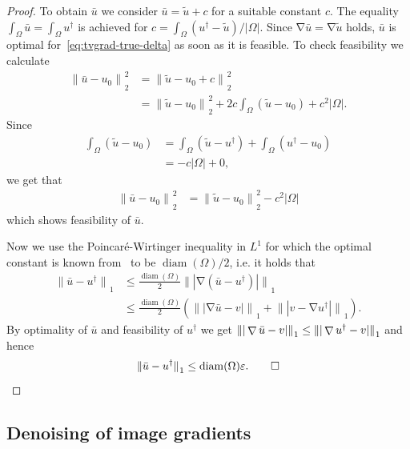 \documentclass[twocolumn,envcountsame]{svjour3}
\newcommand{\norm}[2][]{{\|{#2}\|_{}}_{#1}}
\newcommand{\abs}[1]{|#1|}
\newcommand{\udag}{u^{\dagger}}
\DeclareMathOperator{\diam}{diam}
\DeclareMathOperator{\grad}{\nabla}
\begin{document}
\begin{proof}
  To obtain $\bar u$ we consider $\bar u = \tilde u + c$ for a
  suitable constant $c$. The equality
  $\int_{\Omega}\bar u = \int_{\Omega}\udag$ is achieved for
  $c = \int_{\Omega}(\udag - \tilde u)/\abs{\Omega}$. Since
  $\grad\bar u = \grad \tilde u$ holds, $\bar u$ is optimal
  for~\eqref{eq:tvgrad-true-delta} as soon as it is feasible. To check
  feasibility we calculate
  \begin{align*}
    \norm[2]{\bar u - u_{0}}^{2} & = \norm[2]{\tilde u - u_{0} + c}^{2}\\
    & = \norm[2]{\tilde u - u_{0}}^{2} + 2c\int_{\Omega}(\tilde u - u_{0}) + c^{2}\abs{\Omega}.
  \end{align*}
  Since
  \begin{align*}
  \int_{\Omega}(\tilde u-u_{0}) & = \int_{\Omega}(\tilde u - \udag) + \int_{\Omega}(\udag - u_{0})\\
    & = -c\abs{\Omega} + 0,
  \end{align*}
  we get that
  \begin{align*}
    \norm[2]{\bar u  - u_{0}}^{2} & = \norm[2]{\tilde u - u_{0}}^{2}-c^{2}\abs{\Omega}
  \end{align*}
  which shows feasibility of $\bar u$.
  
  Now we use the Poincar\'e-Wirtinger inequality in $L^{1}$ for which the optimal constant is known from~\cite{acosta2004optimal} to be $\diam(\Omega)/2$, i.e. it holds that
  \begin{align*}
    \norm[1]{\bar u - \udag} 
    &\leq \tfrac{\diam(\Omega)}{2}\norm[1]{\abs{\grad(\bar u - \udag)}} \\
    &\leq \tfrac{\diam(\Omega)}{2}(\norm[1]{\abs{\grad \bar u - v}} 
      + \norm[1]{\abs{v-\grad \udag}}).
  \end{align*}
  By optimality of $\bar u$ and feasibility of $\udag$ we get
  $\norm[1]{\abs{\grad \bar u - v}}\\
  \leq \norm[1]{\abs{\grad\udag -
      v}}$ and hence
  \[
  \norm[1]{\bar u - \udag} \leq  \diam(\Omega) \varepsilon.\hfill\qed
  \]
\end{proof}

\subsection{Denoising of image gradients}
\label{sec:denoising-of-gradients}
\end{document}
